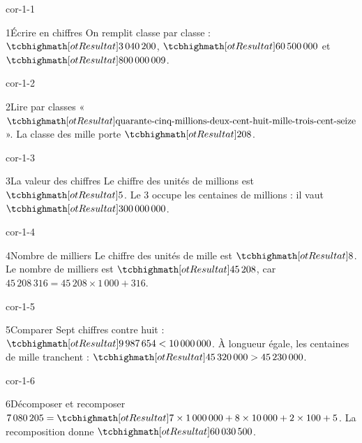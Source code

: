 \clearpage\pagestyle{otMain}\setlength{\otBlocEspacement}{2.5mm}\fontsize{11}{15}\selectfont{}
\begin{blocLivre}{cor-1-1}\begin{corrige}{1}{Écrire en chiffres}
On remplit classe par classe : $\res{3\,040\,200}$, $\res{60\,500\,000}$ et $\res{800\,000\,009}$.
\end{corrige}\end{blocLivre}
\begin{blocLivre}{cor-1-2}\begin{corrige}{2}{Lire par classes}
« $\res{\text{quarante-cinq-millions-deux-cent-huit-mille-trois-cent-seize}}$ ». La classe des mille porte $\res{208}$.
\end{corrige}\end{blocLivre}
\begin{blocLivre}{cor-1-3}\begin{corrige}{3}{La valeur des chiffres}
Le chiffre des unités de millions est $\res5$. Le 3 occupe les centaines de millions : il vaut $\res{300\,000\,000}$.
\end{corrige}\end{blocLivre}
\begin{blocLivre}{cor-1-4}\begin{corrige}{4}{Nombre de milliers}
Le chiffre des unités de mille est $\res8$. Le nombre de milliers est $\res{45\,208}$, car $45\,208\,316=45\,208\times1\,000+316$.
\end{corrige}\end{blocLivre}
\begin{blocLivre}{cor-1-5}\begin{corrige}{5}{Comparer}
Sept chiffres contre huit : $\res{9\,987\,654<10\,000\,000}$. À longueur égale, les centaines de mille tranchent : $\res{45\,320\,000>45\,230\,000}$.
\end{corrige}\end{blocLivre}
\begin{blocLivre}{cor-1-6}\begin{corrige}{6}{Décomposer et recomposer}
$7\,080\,205=\res{7\times1\,000\,000+8\times10\,000+2\times100+5}$. La recomposition donne $\res{60\,030\,500}$.
\end{corrige}\end{blocLivre}
